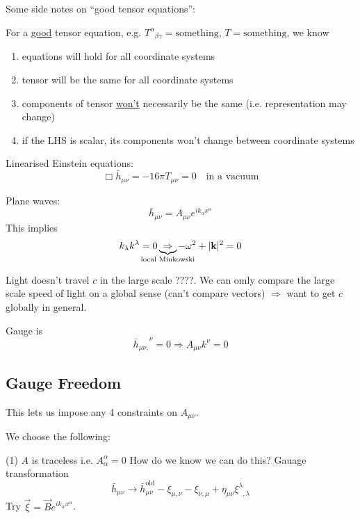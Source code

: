 \documentclass[a4paper]{article} %
\newcommand{\vect}[1]{\mathbf{#1}} %
\newcommand{\ph}[1]{\phantom{#1}}
\begin{document}
\begin{framed}
Some side notes on ``good tensor equations'':

For a \underline{good} tensor equation, e.g. $T^{\alpha}_{\ph{\alpha}\beta\gamma}=\text{something}$, $T=\text{something}$, we know
\begin{enumerate}
\item equations will hold for all coordinate systems
\item tensor will be the same for all coordinate systems
\item components of tensor \underline{won't} necessarily be the same (i.e. representation may change)
\item if the LHS is scalar, its components won't change between coordinate systems
\end{enumerate}
\end{framed}


Linearised Einstein equations:
\begin{equation}
\Box\bar{h}_{\mu\nu}=-16\pi T_{\mu\nu}=0\quad\text{in a vacuum}
\end{equation}

Plane waves:
\begin{equation}
\bar{h}_{\mu\nu}=A_{\mu\nu}e^{ik_{\alpha}x^{\alpha}}
\end{equation}
This implies
\begin{equation}
k_{\lambda}k^{\lambda}=0 \underbrace{\Rightarrow}_{\mathclap{\text{local Minkowski}}} -\omega^2+|\vect{k}|^2=0
\end{equation}

Light doesn't travel $c$ in the large scale ????. We can omly compare the large scale speed of light on a global sense (can't compare vectors) $\Rightarrow$ want to get $c$ globally in general.

Gauge is
\begin{equation}
\bar{h}_{\mu\nu,}^{\ph{\mu\nu,}\nu}=0\Rightarrow A_{\mu\nu}k^{\nu}=0
\end{equation}

\subsection{Gauge Freedom}
This lets us impose any 4 constraints on $A_{\mu\nu}$.

We choose the following:

{\quad\Large (1) $A$ is traceless}
i.e. $A^{\alpha}_{\alpha}=0$
How do we know we can do this? Gauage transformation
\begin{equation}
\bar{h}_{\mu\nu}\to \bar{h}_{\mu\nu}^{\text{old}}-\xi_{\mu,\nu}-\xi_{\nu,\mu}+\eta_{\mu\nu}\xi^{\lambda}
_{\ph{\lambda},\lambda}
\end{equation}
Try $\vec{\xi}=\vec{B}e^{ik_{\alpha}x^{\alpha}}$.
\end{document}
